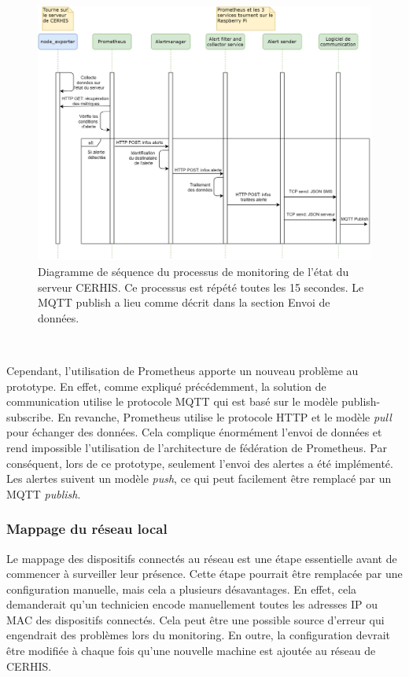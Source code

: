 \begin{figure}
  \includegraphics[width=\textwidth]{img/app/server_mon.png}
  \caption{Diagramme de séquence du processus de monitoring de l'état du serveur CERHIS. Ce processus est répété toutes les 15 secondes.
  Le MQTT publish a lieu comme décrit dans la section Envoi de données.}
  \label{fig:seqnodemon}
\end{figure}

~

\noindent
Cependant, l'utilisation de Prometheus apporte un nouveau problème au prototype. En effet, comme expliqué précédemment, la solution de communication utilise le protocole MQTT qui est basé sur le modèle publish-subscribe. En revanche, Prometheus utilise le protocole HTTP et le modèle \textit{pull} pour échanger des données. Cela complique énormément l'envoi de données et rend impossible l'utilisation de l'architecture de fédération de Prometheus. Par conséquent, lors de ce prototype, seulement l'envoi des alertes a été implémenté. Les alertes suivent un modèle \textit{push}, ce qui peut facilement être remplacé par un MQTT \textit{publish}.


\newpage
\subsubsection{Mappage du réseau local}

\noindent
Le mappage des dispositifs connectés au réseau est une étape essentielle avant de commencer à surveiller leur présence. Cette étape pourrait être remplacée par une configuration manuelle, mais cela a plusieurs désavantages. En effet, cela demanderait qu'un technicien encode manuellement toutes les adresses IP ou MAC des dispositifs connectés. Cela peut être une possible source d'erreur qui engendrait des problèmes lors du monitoring. En outre, la configuration devrait être modifiée à chaque fois qu'une nouvelle machine est ajoutée au réseau de CERHIS.

